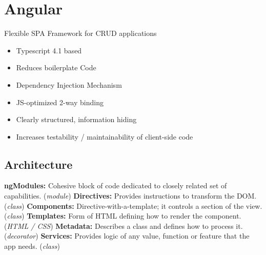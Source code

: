 
\section{Angular}
Flexible SPA Framework for CRUD applications
\begin{itemize}
    \item Typescript 4.1 based
    \item Reduces boilerplate Code
    \item Dependency Injection Mechanism
    \item JS-optimized 2-way binding
    \item Clearly structured, information hiding
    \item Increases testability / maintainability of client-side code
\end{itemize}


\subsection{Architecture}
\textbf{ngModules:} Cohesive block of code dedicated to closely related set of capabilities. (\textit{module})
\textbf{Directives:} Provides instructions to transform the DOM. (\textit{class})
\textbf{Components:} Directive-with-a-template; it controls a section of the view. (\textit{class})
\textbf{Templates:} Form of HTML defining how to render the component. (\textit{HTML / CSS})
\textbf{Metadata:} Describes a class and defines how to process it. (\textit{decorator})
\textbf{Services:} Provides logic of any value, function or feature that the app needs. (\textit{class})

